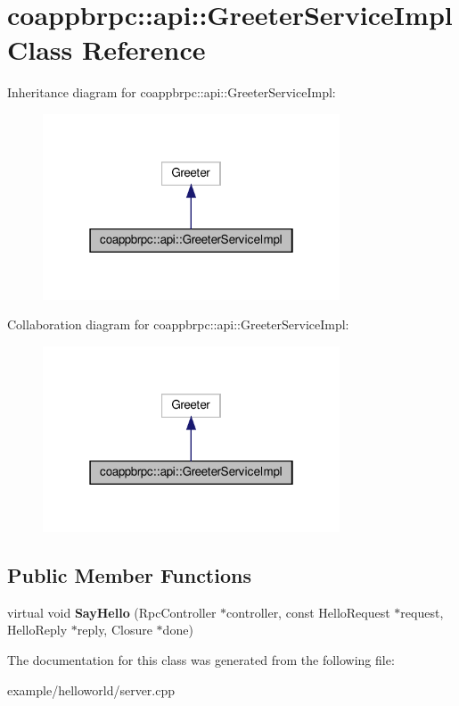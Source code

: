 \hypertarget{classcoappbrpc_1_1api_1_1GreeterServiceImpl}{}\section{coappbrpc\+:\+:api\+:\+:Greeter\+Service\+Impl Class Reference}
\label{classcoappbrpc_1_1api_1_1GreeterServiceImpl}


Inheritance diagram for coappbrpc\+:\+:api\+:\+:Greeter\+Service\+Impl\+:\nopagebreak
\begin{figure}[H]
\begin{center}
\leavevmode
\includegraphics[width=250pt]{classcoappbrpc_1_1api_1_1GreeterServiceImpl__inherit__graph}
\end{center}
\end{figure}


Collaboration diagram for coappbrpc\+:\+:api\+:\+:Greeter\+Service\+Impl\+:\nopagebreak
\begin{figure}[H]
\begin{center}
\leavevmode
\includegraphics[width=250pt]{classcoappbrpc_1_1api_1_1GreeterServiceImpl__coll__graph}
\end{center}
\end{figure}
\subsection*{Public Member Functions}
\begin{DoxyCompactItemize}
\item 
\mbox{\label{classcoappbrpc_1_1api_1_1GreeterServiceImpl_a009b97643d9728170104e367b8f40167}} 
virtual void {\bfseries Say\+Hello} (Rpc\+Controller $\ast$controller, const Hello\+Request $\ast$request, Hello\+Reply $\ast$reply, Closure $\ast$done)
\end{DoxyCompactItemize}


The documentation for this class was generated from the following file\+:\begin{DoxyCompactItemize}
\item 
example/helloworld/server.\+cpp\end{DoxyCompactItemize}
